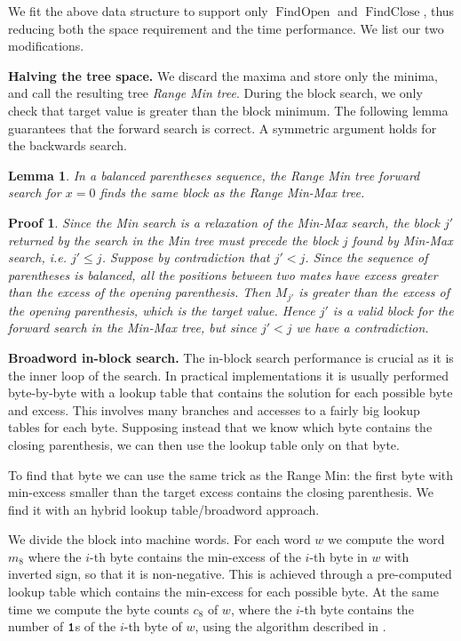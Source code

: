 \documentclass[a4paper,11pt]{article}
\newcommand{\ttlpar}[1]{\noindent\textbf{#1}}
\newtheorem{lemma}[theorem]{Lemma}
\theoremstyle{nonumberplain}
\newtheorem{Proof}{Proof}
\DeclareMathOperator{\FindClose}{FindClose}
\DeclareMathOperator{\FindOpen}{FindOpen}
\newcommand{\bit}[1]{\text{\bf\texttt{#1}}}
\newcommand{\bitone}{\bit{1}}
\begin{document}
We fit the above data structure to support only $\FindOpen$ and
$\FindClose$, thus reducing both the space requirement and the time
performance. We list our two modifications.

\ttlpar{Halving the tree space.}  
We discard the maxima and store only the minima, and call the
resulting tree \emph{Range Min tree}. During the block search, we only
check that target value is greater than the block minimum. The
following lemma guarantees that the forward search is correct. A
symmetric argument holds for the backwards search.
\begin{lemma}
  In a balanced parentheses sequence, the Range Min tree forward
  search for $x=0$ finds the same block as the Range Min-Max tree.
\end{lemma}
\begin{Proof}
  Since the Min search is a relaxation of the Min-Max search, the
  block $j'$ returned by the search in the Min tree must precede the
  block $j$ found by Min-Max search, i.e. $j' \leq j$.
Suppose by contradiction that $j' < j$. Since the sequence of
  parentheses is balanced, all the positions between two mates have
  excess greater than the excess of the opening parenthesis. Then
  $M_{j'}$ is greater than the excess of the opening parenthesis,
  which is the target value. Hence $j'$ is a valid block for the
  forward search in the Min-Max tree, but since $j' < j$ we have a contradiction. 
\end{Proof}


\ttlpar{Broadword in-block search.} 
The in-block search performance is crucial as it is the inner loop of
the search. In practical implementations it is usually performed
byte-by-byte with a lookup table that contains the solution for each
possible byte and excess.  This involves many branches and accesses to
a fairly big lookup tables for each byte. Supposing instead that we
know which byte contains the closing parenthesis, we can then use the
lookup table only on that byte. 

To find that byte we can use the same trick as the
Range Min: the first byte with min-excess smaller than the target
excess contains the closing parenthesis. We find it with an hybrid
lookup table/broadword approach.

We divide the block into machine words. For each word $w$ we compute the
word $m_8$ where the $i$-th byte contains the min-excess of
the $i$-th byte in $w$ with inverted sign, so that it is non-negative. This is achieved through a pre-computed lookup
table which contains the min-excess for each possible byte. At the
same time we compute the byte counts $c_8$ of $w$, where
the $i$-th byte contains the number of $\bitone$s of the $i$-th byte of $w$, 
using the algorithm described in \cite{knuthtaocp}. 
\end{document}
